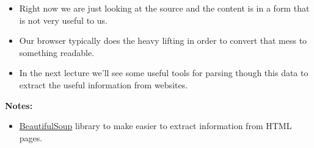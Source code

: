 \documentclass[xcolor=svgnames]{beamer}
\newcommand{\nl}{\\[1em]}
\newcommand{\ft}[1]{\frametitle{#1}}
\begin{document}
\begin{frame}
\begin{itemize}
\item Right now we are just looking at the source and the content is in a form that is not very useful to us.\nl
\item Our browser typically does the heavy lifting in order to convert that mess to something readable.\nl
\item In the next lecture we'll see some useful tools for parsing though this data to extract the useful information from websites.
\end{itemize}
{\bf Notes:}
\begin{itemize}
\item \href{https://www.pythonforbeginners.com/beautifulsoup/beautifulsoup-4-python}{BeautifulSoup} library to make easier to extract information from HTML pages.\end{itemize}

\end{frame}




%
%
%






\end{document}
